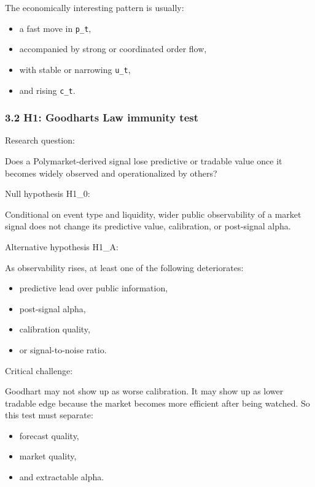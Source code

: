 \documentclass[
]{article}
\providecommand{\tightlist}{%
  \setlength{\itemsep}{0pt}\setlength{\parskip}{0pt}}
\begin{document}
The economically interesting pattern is usually:

\begin{itemize}
\tightlist
\item
  a fast move in \texttt{p\_t},
\item
  accompanied by strong or coordinated order flow,
\item
  with stable or narrowing \texttt{u\_t},
\item
  and rising \texttt{c\_t}.
\end{itemize}

\subsubsection{3.2 H1: Goodhart\textquotesingle s Law immunity
test}\label{32-h1-goodharts-law-immunity-test}

Research question:

Does a Polymarket-derived signal lose predictive or tradable value once
it becomes widely observed and operationalized by others?

Null hypothesis H1\_0:

Conditional on event type and liquidity, wider public observability of a
market signal does not change its predictive value, calibration, or
post-signal alpha.

Alternative hypothesis H1\_A:

As observability rises, at least one of the following deteriorates:

\begin{itemize}
\tightlist
\item
  predictive lead over public information,
\item
  post-signal alpha,
\item
  calibration quality,
\item
  or signal-to-noise ratio.
\end{itemize}

Critical challenge:

Goodhart may not show up as worse calibration. It may show up as lower
tradable edge because the market becomes more efficient after being
watched. So this test must separate:

\begin{itemize}
\tightlist
\item
  forecast quality,
\item
  market quality,
\item
  and extractable alpha.
\end{itemize}
\end{document}
